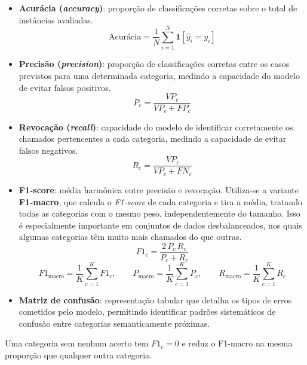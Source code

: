 \documentclass[
    12pt,                %
    openright,           %
    oneside,             %
    a4paper,             %
    english,             %
    brazil               %
]{abntex2}
\begin{document}
\begin{itemize}
\item \textbf{Acurácia (\textit{accuracy})}: proporção de classificações corretas sobre o total de instâncias avaliadas.
\begin{equation}
\mathrm{Acurácia} = \frac{1}{N} \sum_{i=1}^{N} \mathbf{1}\left[\hat{y}_i = y_i\right]
\label{eq:acuracia}
\end{equation}
\item \textbf{Precisão (\textit{precision})}: proporção de classificações corretas entre os casos previstos para uma determinada categoria, medindo a capacidade do modelo de evitar falsos positivos.
\begin{equation}
P_c = \frac{VP_c}{VP_c + FP_c}
\label{eq:precisao}
\end{equation}
\item \textbf{Revocação (\textit{recall})}: capacidade do modelo de identificar corretamente os chamados pertencentes a cada categoria, medindo a capacidade de evitar falsos negativos.
\begin{equation}
R_c = \frac{VP_c}{VP_c + FN_c}
\label{eq:revocacao}
\end{equation}
\item \textbf{F1-score}: média harmônica entre precisão e revocação. Utiliza-se a variante \textbf{F1-macro}, que calcula o \textit{F1-score} de cada categoria e tira a média, tratando todas as categorias com o mesmo peso, independentemente do tamanho. Isso é especialmente importante em conjuntos de dados desbalanceados, nos quais algumas categorias têm muito mais chamados do que outras.
\begin{equation}
F1_c = \frac{2\, P_c\, R_c}{P_c + R_c}
\label{eq:f1}
\end{equation}
\begin{equation}
F1_{\mathrm{macro}} = \frac{1}{K} \sum_{c=1}^{K} F1_c, \qquad
P_{\mathrm{macro}} = \frac{1}{K} \sum_{c=1}^{K} P_c, \qquad
R_{\mathrm{macro}} = \frac{1}{K} \sum_{c=1}^{K} R_c
\label{eq:macro}
\end{equation}
\item \textbf{Matriz de confusão}: representação tabular que detalha os tipos de erros cometidos pelo modelo, permitindo identificar padrões sistemáticos de confusão entre categorias semanticamente próximas.
\end{itemize}

Uma categoria sem nenhum acerto tem $F1_c = 0$ e reduz o F1-macro na mesma proporção que qualquer outra categoria.
\end{document}
